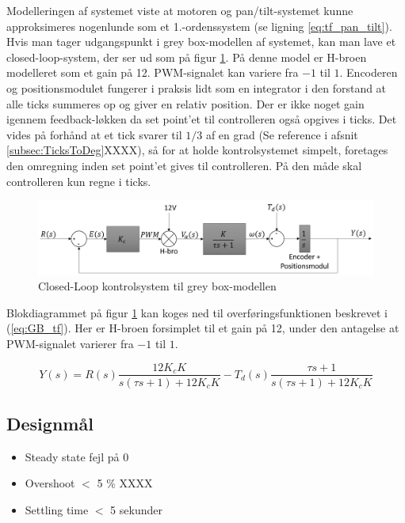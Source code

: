 Modelleringen af systemet viste at motoren og pan/tilt-systemet kunne approksimeres nogenlunde som et 1.-ordenssystem (se ligning \eqref{eq:tf_pan_tilt}).
Hvis man tager udgangspunkt i grey box-modellen af systemet, kan man lave et closed-loop-system, der ser ud som på figur \ref{fig:GB_Model}. På denne model er H-broen modelleret som et gain på 12. PWM-signalet kan variere fra $-1$ til $1$. Encoderen og positionsmodulet fungerer i praksis lidt som en integrator i den forstand at alle ticks summeres op og giver en relativ position. Der er ikke noget gain igennem feedback-løkken da set point'et til controlleren også opgives i ticks. Det vides på forhånd at et tick svarer til $1/3$ af en grad (Se reference i afsnit \ref{subsec:TicksToDeg}XXXX), så for at holde kontrolsystemet simpelt, foretages den omregning inden set point'et gives til controlleren. På den måde skal controlleren kun regne i ticks.

\begin{figure}[ht]
	\begin{center}
		\includegraphics[scale=0.5]{Billeder/Control_Loop.PNG}
	\end{center}
\caption{Closed-Loop kontrolsystem til grey box-modellen}
\label{fig:GB_Model}
\end{figure}

Blokdiagrammet på figur \ref{fig:GB_Model} kan koges ned til overføringsfunktionen beskrevet i (\ref{eq:GB_tf}). Her er H-broen forsimplet til et gain på 12, under den antagelse at PWM-signalet varierer fra $-1$ til $1$.

\begin{equation}\label{eq:GB_tf}
Y(s)=R(s)\frac{12K_{c}K}{s(\tau s+1)+12K_{c}K}-T_{d}(s)\frac{\tau s+1}{s(\tau s+1)+12K_{c}K}
\end{equation}

\subsection{Designmål}

\begin{itemize}

\item Steady state fejl på 0
\item Overshoot $<$ 5 $\%$ XXXX
\item Settling time $<$ 5 sekunder 

\end{itemize}


